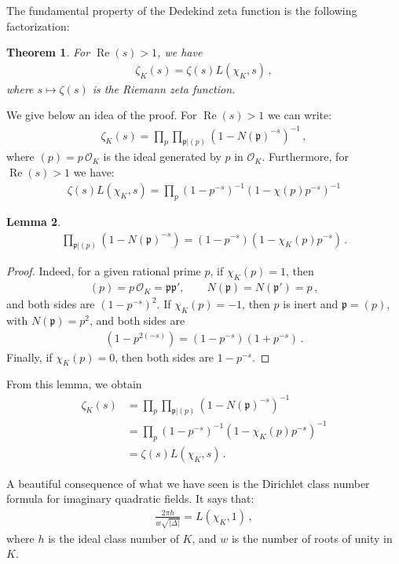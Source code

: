 \documentclass[reqno]{amsart}
\theoremstyle{plain}
\newtheorem{theorem}{Theorem}[section]
\newtheorem{lemma}[theorem]{Lemma}
\theoremstyle{definition}
\theoremstyle{remark}
\numberwithin{equation}{section}
\begin{document}
The fundamental property of the Dedekind zeta function is the
following factorization:
\begin{theorem}
  For ${{\operatorname{Re}}}(s)>1$, we have
  \begin{align*}
    \zeta_K(s) = \zeta(s) L(\chi_K,s)\,,
  \end{align*}
  where $s\mapsto \zeta(s)$ is the Riemann zeta function.
\end{theorem}
We give below an idea of the proof. For ${{\operatorname{Re}}}(s)>1$ we can write:
\begin{align}\label{zeta decomposition}
  \zeta_K(s) = \prod_{p} \prod_{\mathfrak{p}|(p)} \left(1-N(\mathfrak{p})^{-s}\right)^{-1}\,,
\end{align}
where $(p)=p\,{{\mathcal O}}_K$ is the ideal generated by $p$ in
${{\mathcal O}}_K$. Furthermore, for ${{\operatorname{Re}}}(s)>1$ we have:
\begin{align*}
  \zeta(s) L(\chi_K,s) = \prod_{p} (1-p^{-s})^{-1} (1-\chi(p) p^{-s})^{-1}
\end{align*}
\begin{lemma}
  \begin{align*}
    \prod_{\mathfrak{p}|(p)} \left(1-N(\mathfrak{p})^{-s}\right)
    = (1-p^{-s})(1-\chi_K(p) p^{-s})\,.
  \end{align*}
\end{lemma}
\begin{proof}
  Indeed, for a given rational prime $p$, if $\chi_K(p)=1$, then
  \begin{align*}
    (p) = p\,{{\mathcal O}}_K = \mathfrak{p}\mathfrak{p}',\qquad
    N(\mathfrak{p})=N(\mathfrak{p}')=p\,,
  \end{align*}
  and both sides are $(1-p^{-s})^2$.  If $\chi_K(p)=-1$, then $p$ is
  inert and $\mathfrak{p}=(p)$, with $N(\mathfrak{p})=p^2$, and both
  sides are
  \begin{align*}
    (1-p^{2(-s)}) = (1-p^{-s})(1+p^{-s})\,.
  \end{align*}
  Finally, if $\chi_K(p)=0$, then both sides are $1-p^{-s}$.
\end{proof}
From this lemma, we obtain
\begin{align*}
  \zeta_K(s) &= \prod_p \prod_{\mathfrak{p}|(p)} \left(1-N(\mathfrak{p})^{-s}\right)^{-1}\\
  &= \prod_p (1-p^{-s})^{-1} (1-\chi_K(p) p^{-s})^{-1}\\
  &= \zeta(s) L(\chi_K,s)\,.
\end{align*}

A beautiful consequence of what we have seen is the Dirichlet class
number formula for imaginary quadratic fields. It says that:
\begin{align*}
  \frac{2\pi h}{w \sqrt{|\Delta|}} = L(\chi_K,1)\,,
\end{align*}
where $h$ is the ideal class number of $K$, and $w$ is the number of
roots of unity in $K$.
\end{document}
